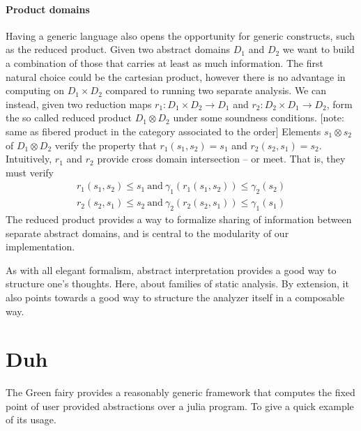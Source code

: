 \documentclass[14pt]{article}
\begin{document}
\paragraph{Product domains} Having a generic language also opens the opportunity for generic constructs, such as the reduced product. Given two abstract domains $D_1$ and $D_2$ we want to build a combination of those that carries at least as much information. The first natural choice could be the cartesian product, however there is no advantage in computing on $D_1\times D_2$ compared to running two separate analysis. We can instead, given two reduction maps $r_1:D_1\times D_2\to D_1$ and $r_2:D_2\times D_1\to D_2$, form the so called reduced product $D_1 \otimes D_2$ under some soundness conditions. [note: same as fibered product in the category associated to the order] Elements $s_1\otimes s_2$ of $D_1 \otimes D_2$ verify the property that $r_1(s_1,s_2) = s_1$ and $r_2(s_2,s_1) = s_2$. Intuitively, $r_1$ and $r_2$ provide cross domain intersection -- or meet. That is, they must verify
\begin{align*}
r_1(s_1,s_2) \leq s_1~\text{and}~ \gamma_1(r_1(s_1,s_2)) \leq \gamma_2(s_2) \\
r_2(s_2,s_1) \leq s_2~\text{and}~ \gamma_2(r_2(s_2,s_1)) \leq \gamma_1(s_1)
\end{align*}
The reduced product provides a way to formalize sharing of information between separate abstract domains, and is central to the modularity of our implementation.


As with all elegant formalism, abstract interpretation provides a good way to structure one's thoughts. Here, about families of static analysis. By extension, it also points towards a good way to structure the analyzer itself in a composable way.

\section*{Duh}

The Green fairy provides a reasonably generic framework that computes the fixed point of user provided abstractions over a julia program. To give a quick example of its usage.
\end{document}
